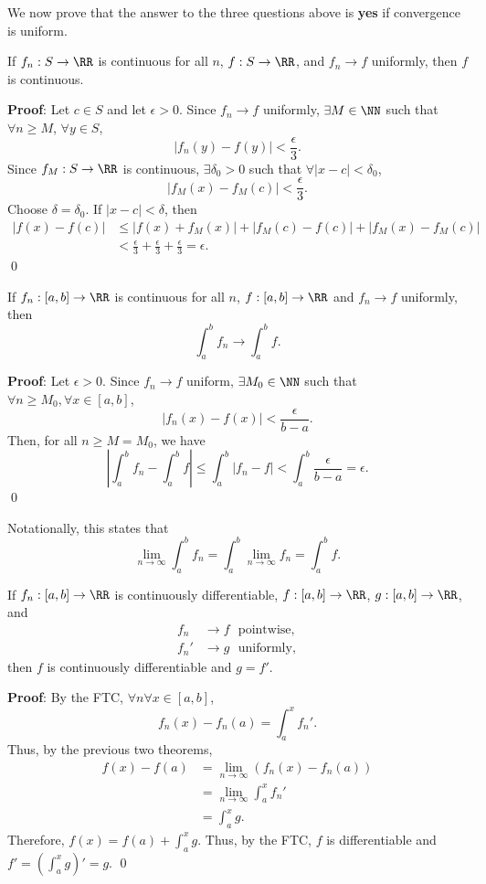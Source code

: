 We now prove that the answer to the three questions above is \textbf{yes} if convergence is uniform.
\begin{theorem}
If $f_n:S\to \RR$ is continuous for all $n$, $f:S\to \RR$, and $f_n\to f$ uniformly, then $f$ is continuous.
\end{theorem}
\textbf{Proof}: Let $c\in S$ and let $\epsilon>0$. Since $f_n\to f$ uniformly, $\exists M\in \NN$ such that $\forall n\geq M$, $\forall y\in S$,
\[
|f_n(y) - f(y)| < \frac{\epsilon}{3}.
\]
Since $f_M:S\to \RR$ is continuous, $\exists \delta_0>0$ such that $\forall |x-c|<\delta_0$,
\[
|f_M(x)-f_M(c)|< \frac{\epsilon}{3}.
\]
Choose $\delta = \delta_0$. If $|x-c|<\delta$, then 
\begin{align*}
    |f(x)-f(c)| &\leq |f(x) + f_M(x)| + |f_M(c) - f(c)| + |f_M(x)-f_M(c)| \\
    &< \frac{\epsilon}{3} + \frac{\epsilon}{3} + \frac{\epsilon}{3} = \epsilon.
\end{align*}\qed 

\begin{theorem}
If $f_n:[a,b]\to \RR$ is continuous for all $n$, $f:[a,b]\to \RR$ and $f_n\to f$ uniformly, then 
\[
\int_a^b f_n\to \int_a^b f.
\]
\end{theorem}
\textbf{Proof}: Let $\epsilon>0$. Since $f_n\to f$ uniform, $\exists M_0\in \NN$ such that $\forall n\geq M_0,\forall x\in[a,b]$,
\[
|f_n(x) -f(x)| < \frac{\epsilon}{b-a}.
\]
Then, for all $n\geq M = M_0$, we have 
\[
\left|\int_a^b f_n - \int_a^b f\right| \leq \int_a^b |f_n-f|<\int_a^b \frac{\epsilon}{b-a} = \epsilon.
\]\qed

\begin{remark}
Notationally, this states that 
\[
\lim_{n\to \infty} \int_a^b f_n = \int_a^b \lim_{n\to \infty} f_n = \int_a^b f.
\]
\end{remark}

\begin{theorem}
If $f_n:[a,b]\to \RR$ is continuously differentiable, $f:[a,b]\to \RR$, $g:[a,b]\to \RR$, and 
\begin{align*}
    f_n &\to f \text{~~pointwise}, \\
    f_n' &\to g \text{~~uniformly},
\end{align*}
then $f$ is continuously differentiable and $g = f'$.
\end{theorem}
\textbf{Proof}: By the FTC, $\forall n\forall x\in[a,b]$,
\[
f_n(x) - f_n(a) = \int_a^x f_n'.
\]
Thus, by the previous two theorems,
\begin{align*}
    f(x) - f(a) &= \lim_{n\to \infty} (f_n(x) - f_n(a)) \\
    &= \lim_{n\to \infty}\int_a^x f_n' \\
    &= \int_a^x g.
\end{align*}
Therefore, $f(x) = f(a) +\int_a^x g$. Thus, by the FTC, $f$ is differentiable and $f' = (\int_a^x g)' = g.$ \qed 

